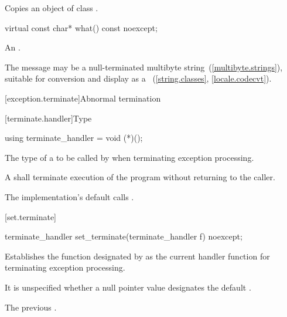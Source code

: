 \begin{itemdescr}
\pnum
\effects
Copies an object of class
.
\end{itemdescr}

%
\begin{itemdecl}
virtual const char* what() const noexcept;
\end{itemdecl}

\begin{itemdescr}
\pnum
\returns
An  \ntbs.%

\pnum
\remarks
The message may be a null-terminated multibyte string~(\ref{multibyte.strings}),
suitable for conversion and display as a
~(\ref{string.classes}, \ref{locale.codecvt}).
\end{itemdescr}

[exception.terminate]{Abnormal termination}

[terminate.handler]{Type }

%
\begin{itemdecl}
using terminate_handler = void (*)();
\end{itemdecl}

\begin{itemdescr}
\pnum
The type of a
to be called by
%
when terminating exception processing.

\pnum
\required
A  shall
terminate execution of the program without returning to the caller.

\pnum
{}
The implementation's default  calls
.%
\end{itemdescr}

[set.terminate]{}

%
\begin{itemdecl}
terminate_handler set_terminate(terminate_handler f) noexcept;
\end{itemdecl}

\begin{itemdescr}
\pnum
\effects
Establishes the function designated by  as the current
handler function for terminating exception processing.

\pnum
\remarks It is unspecified whether a null pointer value designates the default
.

\pnum
\returns
The previous .
\end{itemdescr}


